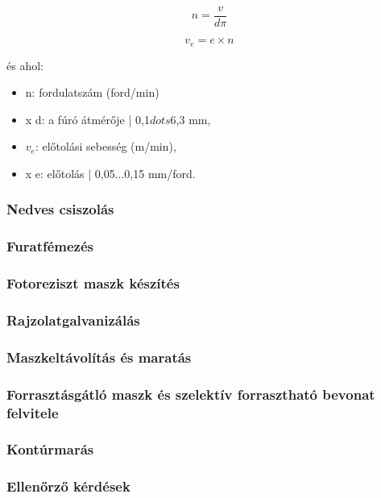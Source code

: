 \documentclass[../labor.tex]{subfiles}
\begin{document}
    \[n = \frac{v}{d\pi} \]

    \[v_e = e \times n \]

    és ahol:

    \begin{itemize}
        \item{n: fordulatszám (ford/min)}
        \item{x d: a fúró átmérője | 0,1$dots$6,3 mm,}
        \item{$v_e$: előtolási sebesség (m/min),}
        \item{x e: előtolás | 0,05...0,15 mm/ford.}
    \end{itemize}

    \subsubsection{Nedves csiszolás}

    \subsubsection{Furatfémezés}
    
    \subsubsection{Fotoreziszt maszk készítés}
    
    \subsubsection{Rajzolatgalvanizálás}

    \subsubsection{Maszkeltávolítás és maratás}

    \subsubsection{Forrasztásgátló maszk és szelektív forrasztható bevonat felvitele}

    \subsubsection{Kontúrmarás}

    \subsubsection{Ellenőrző kérdések}
\end{document}
